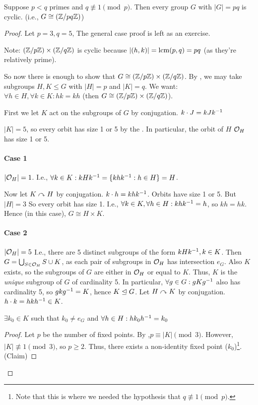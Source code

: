 \documentclass[notes.tex]{subfiles}
\begin{document}

\begin{theorem}
	Suppose $p<q$ primes and $q \not\equiv 1\pmod p$. Then every group $G$ with $|G| = pq$ is cyclic. (i.e., $G\cong (\mathbb{Z}/{pq}\mathbb{Z})$)
\end{theorem}
\begin{proof}
	Let $p=3, q =5$, The general case proof is left as an exercise.

	Note: $(\mathbb{Z}/{p}\mathbb{Z}) \times (\mathbb{Z}/{q}\mathbb{Z})$ is cyclic because $|(h, k)| = \operatorname{\mathrm{lcm}} (p, q) = pq$ (as they're relatively prime).

	So now there is enough to show that $G\cong (\mathbb{Z}/{p}\mathbb{Z}) \times (\mathbb{Z}/{q}\mathbb{Z})$.
	By , we may take subgroups $H, K\le G$ with $|H| = p$ and $|K| = q$.
	We want: $\forall h\in H, \forall k\in K: hk = kh$ (then $G\cong (\mathbb{Z}/{p}\mathbb{Z}) \times (\mathbb{Z}/{q}\mathbb{Z})$).

	First we let $K$ act on the subgroups of $G$ by conjugation. $k\cdot J = kJ{k}^{-1}$

	$|K| = 5$, so every orbit has size 1 or 5 by the . In particular, the orbit of $H$ $\mathcal{O}_H$ has size 1 or 5.

	\paragraph{Case 1} $|\mathcal{O}_H| = 1$. I.e., $\forall k\in K: kH{k}^{-1} = \{kh{k}^{-1} : h\in H\} = H$.

	Now let $K\curvearrowright H$ by conjugation. $k\cdot h = kh{k}^{-1}$. Orbits have size 1 or 5. But $|H| = 3$ So every orbit has size 1. I.e., $\forall k\in K, \forall h\in H: kh{k}^{-1} = h$, so $kh = hk$. Hence (in this case), $G\cong H\times K$.

	\paragraph{Case 2} $|\mathcal{O}_H| = 5$ I.e., there are 5 distinct subgroups of the form $kH{k}^{-1}, k\in K$. Then $G = \bigcup_{S\in \mathcal{O}_H}S \cup K$, as each pair of subgroups in $\mathcal{O}_H$ has intersection $e_G$. Also $K$ exists, so the subgroups of $G$ are either in $\mathcal{O}_H$ or equal to $K$.
	Thus, $K$ is the \emph{unique} subgroup of $G$ of cardinality 5. In particular, $\forall g\in G: gK{g}^{-1}$ also has cardinality 5, so $gk{g}^{-1} = K$, hence $K\trianglelefteq G$.
	Let $H\curvearrowright K$ by conjugation. $h\cdot k = hk{h}^{-1} \in K$.

	\begin{claim}[1]
		$\exists k_0\in K$ such that $k_0\ne e_G$ and $\forall h\in H: hk_0{h}^{-1} = k_0$
	\end{claim}
	\begin{proof}
		Let $p$ be the number of fixed points.
		By ,$ p\equiv |K|\pmod 3$.
		However, $|K|\not\equiv 1\pmod 3$, so $p \ge 2$.
		Thus, there exists a non-identity fixed point ($k_0$)\footnote{Note that this is where we needed the hypothesis that $q\not\equiv 1\pmod p$.}.
		\qedhere(Claim)
	\end{proof}


\end{proof}
\end{document}
